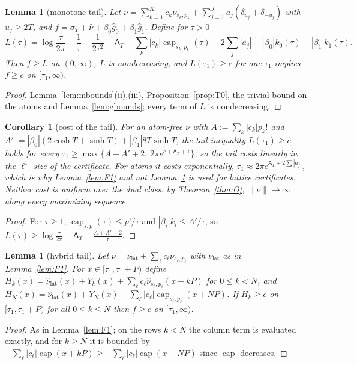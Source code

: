 \documentclass[11pt]{amsart}
\newtheorem{lemma}[theorem]{Lemma}
\newtheorem{corollary}[theorem]{Corollary}
\theoremstyle{definition}
\theoremstyle{remark}
\newcommand{\sT}{\sigma_T}
\newcommand{\gh}[1]{\widehat g_{#1}}
\newcommand{\nuh}{\widehat\nu}
\newcommand{\Aconst}{\mathsf A_T}
\begin{document}
\begin{lemma}[monotone tail]\label{lem:T}
Let $\nu=\sum_{k=1}^Kc_k\nu_{s_k,p_k}+\sum_{j=1}^Ja_j(\delta_{u_j}+\delta_{-u_j})$ with $u_j\ge2T$, and
$f=\sT+\nuh+\beta_0\gh0+\beta_1\gh1$. Define for $\tau>0$
\[
L(\tau)=\log\frac\tau{2\pi}-\frac1\tau-\frac1{2\tau^2}-\Aconst-\sum_k|c_k|\operatorname{cap}_{s_k,p_k}(\tau)
-2\sum_j|a_j|-|\beta_0|k_0(\tau)-|\beta_1|k_1(\tau).
\]
Then $f\ge L$ on $(0,\infty)$, $L$ is nondecreasing, and $L(\tau_1)\ge c$ for one $\tau_1$ implies
$f\ge c$ on $[\tau_1,\infty)$.
\end{lemma}
\begin{proof}
Lemma~\ref{lem:mbounds}(ii),(iii), Proposition~\ref{prop:T0}, the trivial bound on the atoms and
Lemma~\ref{lem:gbounds}; every term of $L$ is nondecreasing.
\end{proof}

\begin{corollary}[cost of the tail]\label{cor:T2}
For an atom-free $\nu$ with $A:=\sum_k|c_k|p_k!$ and $A':=|\beta_0|(2\cosh T+\sinh T)+|\beta_1|8T\sinh T$,
the tail inequality $L(\tau_1)\ge c$ holds for every $\tau_1\ge\max\{A+A'+2,\ 2\pi e^{c+\Aconst+1}\}$,
so the tail costs linearly in the $\ell^1$ size of the certificate. For atoms it costs
exponentially, $\tau_1\approx2\pi e^{\Aconst+2\sum|a_j|}$, which is why Lemma~\ref{lem:F1} and not
Lemma~\ref{lem:T} is used for lattice certificates. Neither cost is uniform over the dual class:
by Theorem~\ref{thm:O}, $\|\nu\|\to\infty$ along every maximizing sequence.
\end{corollary}
\begin{proof}
For $\tau\ge1$, $\operatorname{cap}_{s,p}(\tau)\le p!/\tau$ and $|\beta_i|k_i\le A'/\tau$, so
$L(\tau)\ge\log\frac\tau{2\pi}-\Aconst-\frac{A+A'+2}{\tau}$.
\end{proof}

\begin{lemma}[hybrid tail]\label{lem:hybrid}
Let $\nu=\nu_{\mathrm{lat}}+\sum_\ell c_\ell\nu_{s_\ell,p_\ell}$ with $\nu_{\mathrm{lat}}$ as in Lemma~\ref{lem:F1}.
For $x\in[\tau_1,\tau_1+P)$ define $H_k(x)=\nuh_{\mathrm{lat}}(x)+Y_k(x)+\sum_\ell c_\ell\nuh_{s_\ell,p_\ell}(x+kP)$
for $0\le k<N$, and $H_N(x)=\nuh_{\mathrm{lat}}(x)+Y_N(x)-\sum_\ell|c_\ell|\operatorname{cap}_{s_\ell,p_\ell}(x+NP)$.
If $H_k\ge c$ on $[\tau_1,\tau_1+P)$ for all $0\le k\le N$ then $f\ge c$ on $[\tau_1,\infty)$.
\end{lemma}
\begin{proof}
As in Lemma~\ref{lem:F1}; on the rows $k<N$ the column term is evaluated exactly, and for
$k\ge N$ it is bounded by $-\sum_\ell|c_\ell|\operatorname{cap}(x+kP)\ge-\sum_\ell|c_\ell|\operatorname{cap}(x+NP)$
since $\operatorname{cap}$ decreases.
\end{proof}
\end{document}
